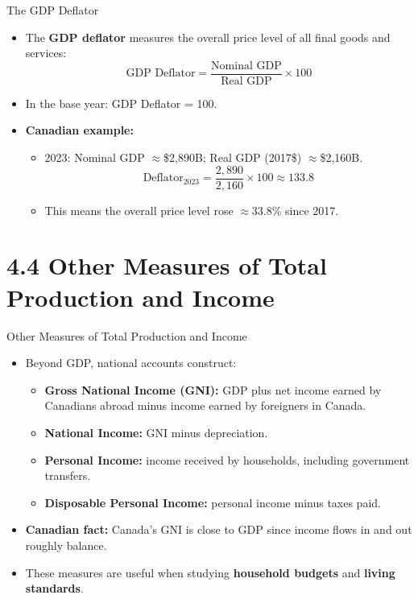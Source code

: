 \documentclass[aspectratio=169]{beamer}
\begin{document}
\begin{frame}{The GDP Deflator}
\transfade
\begin{itemize}
  \item The \textbf{GDP deflator} measures the overall price level of all final goods and services:
  \[
    \text{GDP Deflator} = \frac{\text{Nominal GDP}}{\text{Real GDP}} \times 100
  \]
  \item In the base year: GDP Deflator = 100.
  \item \textbf{Canadian example:}
  \begin{itemize}
    \item 2023: Nominal GDP $\approx$\$2,890B; Real GDP (2017\$) $\approx$\$2,160B.
    \[
      \text{Deflator}_{2023} = \frac{2{,}890}{2{,}160} \times 100 \approx 133.8
    \]
    \item This means the overall price level rose $\approx$33.8\% since 2017.
  \end{itemize}
\end{itemize}
\end{frame}

\section{4.4 Other Measures of Total Production and Income}

\begin{frame}{Other Measures of Total Production and Income}
\transfade
\begin{itemize}
  \item Beyond GDP, national accounts construct:
  \begin{itemize}
    \item \textbf{Gross National Income (GNI):} GDP plus net income earned by Canadians abroad minus income earned by foreigners in Canada.
    \item \textbf{National Income:} GNI minus depreciation.
    \item \textbf{Personal Income:} income received by households, including government transfers.
    \item \textbf{Disposable Personal Income:} personal income minus taxes paid.
  \end{itemize}
  \item \textbf{Canadian fact:} Canada's GNI is close to GDP since income flows in and out roughly balance.
  \item These measures are useful when studying \textbf{household budgets} and \textbf{living standards}.
\end{itemize}
\end{frame}
\end{document}
